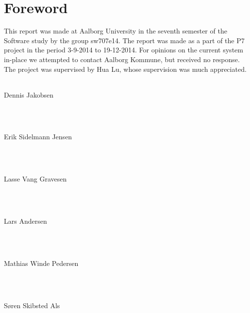 \thispagestyle{empty}
\section*{Foreword}
\noindent This report was made at Aalborg University in the seventh semester of the Software study by the group sw707e14. The report was made as a part of the P7 project in the period 3-9-2014 to 19-12-2014. For opinions on the current system in-place we attempted to contact Aalborg Kommune, but received no response. The project was supervised by Hua Lu, whose supervision was much appreciated. \\ \\

\noindent
\vspace{5mm}
\parbox[h]{4cm}{Dennis Jakobsen}\hspace{0.5cm} \makebox[7cm]{\hrulefill} \\ \\
\vspace{5mm}
\parbox[h]{4cm}{Erik Sidelmann Jensen}\hspace{0.5cm} \makebox[7cm]{\hrulefill} \\ \\
\vspace{5mm}
\parbox[h]{4cm}{Lasse Vang Gravesen}\hspace{0.5cm} \makebox[7cm]{\hrulefill} \\ \\
\vspace{5mm}
\parbox[h]{4cm}{Lars Andersen}\hspace{0.5cm} \makebox[7cm]{\hrulefill} \\ \\
\vspace{5mm}
\parbox[h]{4cm}{Mathias Winde Pedersen}\hspace{0.5cm} \makebox[7cm]{\hrulefill} \\ \\
\vspace{5mm}
\parbox[h]{4cm}{Søren Skibsted Als}\hspace{0.5cm} \makebox[7cm]{\hrulefill} \\ \\

\newpage
